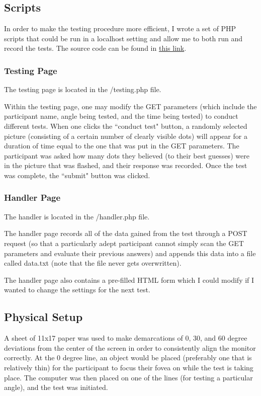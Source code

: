 \documentclass[12pt]{article}
\begin{document}
\subsection{Scripts}

In order to make the testing procedure more efficient, I wrote a set of PHP
scripts that could be run in a localhost setting and allow me to both run and record the
tests. The source code can be found in
\href{https://github.com/junikimm717/OMSB9-Final-Project}{this link}.

\subsubsection{Testing Page}
The testing page is located in the /testing.php file.

Within the testing page, one may modify the GET parameters (which include the
participant name, angle being tested, and the time being tested) to
conduct different tests. When one clicks the ``conduct test" button, a randomly
selected picture (consisting of a certain number of clearly visible dots) will
appear for a duration of time equal to the one that was put in the GET
parameters. The participant was asked how many dots they believed (to their
best guesses) were in the picture that was flashed, and their response
was recorded. Once the test was complete, the ``submit" button was clicked.

\subsubsection{Handler Page}
The handler is located in the /handler.php file.

The handler page records all of the data gained from the test through a POST
request (so that a particularly adept participant cannot simply scan the GET
parameters and evaluate their previous answers) and appends this data
into a file called data.txt (note that the file never gets overwritten).

The handler page also contains a pre-filled HTML form which I could
modify if I wanted to change the settings for the next test.

\subsection{Physical Setup}
A sheet of 11x17 paper was used to make demarcations of 0, 30, and 60 degree
deviations from the center of the screen in order to consistently align the
monitor correctly. At the 0 degree line, an object would be placed (preferably
one that is relatively thin) for the participant to focus their fovea
on while the test is taking place.  The computer was then placed on one of the
lines (for testing a particular angle), and the test was initiated.
\end{document}
